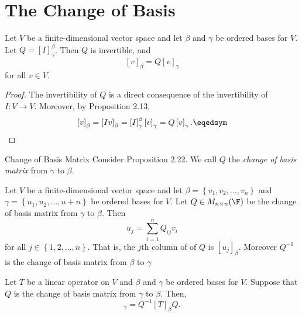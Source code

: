 \documentclass[linearalgebra]{subfiles}
\begin{document}
    \clearpage
    \section{The Change of Basis}

    \begin{prop}{}
        Let $V$ be a finite-dimensional vector space and let $\beta$ and $\gamma$ be ordered bases for $V$. Let $Q=\left[ I \right] ^\beta_\gamma$. Then $Q$ is invertible, and
        \begin{equation*}
            \left[ v \right] _\beta = Q\left[ v \right] _\gamma
        \end{equation*}
        for all $v\in V$.
    \end{prop}

    \begin{proof}
        The invertibility of $Q$ is a direct consequence of the invertibility of $I:V\to V$. Moreover, by Proposition 2.13,
        \begin{equation*}
            \left[ v \right] _\beta = \left[ Iv \right] _\beta = \left[ I \right] ^\beta_\gamma\left[ v \right] _\gamma = Q\left[ v \right] _\gamma.\eqedsym
        \end{equation*}
    \end{proof}

    \begin{definition}{Change of Basis Matrix}{}
        Consider Proposition 2.22. We call $Q$ the \emph{change of basis matrix} from $\gamma$ to $\beta$.
    \end{definition}

    \begin{remark}
        Let $V$ be a finite-dimensional vector space and let $\beta = \left\lbrace v_1,v_2,\ldots,v_n \right\rbrace$ and $\gamma = \left\lbrace u_1,u_2,\ldots,u+n \right\rbrace$ be ordered bases for $V$. Let $Q\in M_{n\times n}(\F)$ be the change of basis matrix from $\gamma$ to $\beta$. Then
        \begin{equation*}
            u_j = \sum^{n}_{i=1} Q_{ij}v_i
        \end{equation*}
        for all $j\in \left\lbrace 1,2,\ldots,n \right\rbrace$. That is, the $j$th column of of $Q$ is $\left[ u_j \right] _\beta$. Moreover $Q^{-1} $ is the change of basis matrix from $\beta$ to $\gamma$
    \end{remark}

    \begin{prop}{}
        Let $T$ be a linear operator on $V$ and $\beta$ and $\gamma$ be ordered bases for $V$. Suppose that $Q$ is the change of basis matrix from $\gamma$ to $\beta$. Then,
        \begin{equation*}
            [T]_{\gamma} = Q^{-1} [T]_\beta Q.
        \end{equation*}
    \end{prop}
\end{document}
